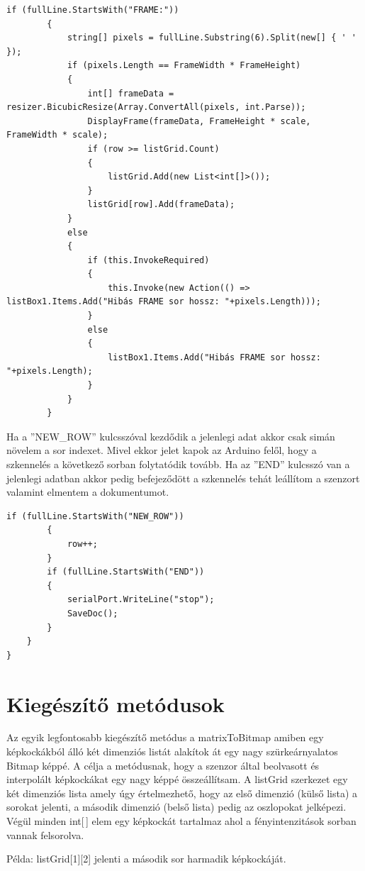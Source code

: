 \documentclass[]{thesis-ekf}
\theoremstyle{definition}
\theoremstyle{remark}
\begin{document}
\begin{lstlisting}[language=CSharp]
		if (fullLine.StartsWith("FRAME:"))
		{
			string[] pixels = fullLine.Substring(6).Split(new[] { ' ' });
			if (pixels.Length == FrameWidth * FrameHeight)
			{
				int[] frameData = resizer.BicubicResize(Array.ConvertAll(pixels, int.Parse));
				DisplayFrame(frameData, FrameHeight * scale, FrameWidth * scale);
				if (row >= listGrid.Count)
				{
					listGrid.Add(new List<int[]>());
				}
				listGrid[row].Add(frameData);
			}
			else
			{
				if (this.InvokeRequired)
				{
					this.Invoke(new Action(() => listBox1.Items.Add("Hibás FRAME sor hossz: "+pixels.Length)));
				}
				else
				{
					listBox1.Items.Add("Hibás FRAME sor hossz: "+pixels.Length);
				}
			}
		}
\end{lstlisting}
Ha a ''NEW\_ROW'' kulcsszóval kezdődik a jelenlegi adat akkor csak simán növelem a sor indexet. Mivel ekkor jelet kapok az Arduino felől, hogy a szkennelés a következő sorban folytatódik tovább. Ha az ''END'' kulcsszó van a jelenlegi adatban akkor pedig befejeződött a szkennelés tehát leállítom a szenzort valamint elmentem a dokumentumot.
\begin{lstlisting}[language=CSharp]
		if (fullLine.StartsWith("NEW_ROW"))
		{
			row++;	
		}
		if (fullLine.StartsWith("END"))
		{
			serialPort.WriteLine("stop");
			SaveDoc();
		}
	}
}
\end{lstlisting}
\section{Kiegészítő metódusok}
Az egyik legfontosabb kiegészítő metódus a matrixToBitmap amiben egy képkockákból álló két dimenziós listát alakítok át egy nagy szürkeárnyalatos Bitmap\cite{bitmap.class} képpé. A célja a metódusnak, hogy a szenzor által beolvasott és interpolált képkockákat egy nagy képpé összeállítsam. A listGrid szerkezet egy két dimenziós lista amely úgy értelmezhető, hogy az első dimenzió (külső lista) a sorokat jelenti, a második dimenzió (belső lista) pedig az oszlopokat jelképezi. Végül minden int[\,] elem egy képkockát tartalmaz ahol a fényintenzitások sorban vannak felsorolva. 

Példa: listGrid[1][2] jelenti a második sor harmadik képkockáját.
\end{document}
